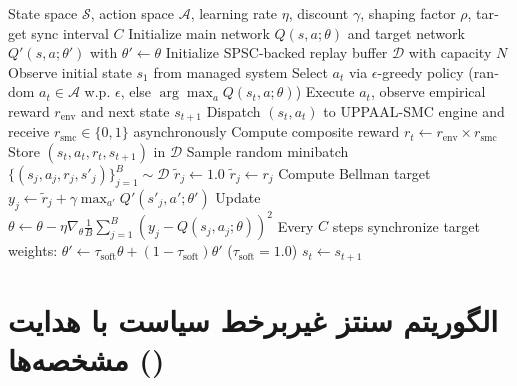 \documentclass[oneside,openany,phd]{TMU-Thesis}
\begin{document}
\begin{algorithm}[htbp]
\caption{الگوریتم آموزش چارچوب پایه‌ای  با شکل‌دهی تصادفی پاداش}
\label{alg:app_rs_drl_full}
\begin{latin}
\small
\begin{algorithmic}[1]
\REQUIRE State space $\mathcal{S}$, action space $\mathcal{A}$, learning rate $\eta$, discount $\gamma$, shaping factor $\rho$, target sync interval $C$
\STATE Initialize main network $Q(s, a; \theta)$ and target network $Q'(s, a; \theta')$ with $\theta' \leftarrow \theta$
\STATE Initialize SPSC-backed replay buffer $\mathcal{D}$ with capacity $N$
    \STATE Observe initial state $s_1$ from managed system
        \STATE Select $a_t$ via $\epsilon$-greedy policy (random $a_t \in \mathcal{A}$ w.p. $\epsilon$, else $\arg\max_a Q(s_t, a; \theta)$)
        \STATE Execute $a_t$, observe empirical reward $r_{\text{env}}$ and next state $s_{t+1}$
        \STATE Dispatch $(s_t, a_t)$ to UPPAAL-SMC engine and receive $r_{\text{smc}} \in \{0, 1\}$ asynchronously
        \STATE Compute composite reward $r_t \leftarrow r_{\text{env}} \times r_{\text{smc}}$
        \STATE Store $(s_t, a_t, r_t, s_{t+1})$ in $\mathcal{D}$ 
            \STATE Sample random minibatch $\{(s_j, a_j, r_j, s'_{j})\}_{j=1}^B \sim \mathcal{D}$
                    \STATE $\tilde{r}_j \leftarrow 1.0$ 
                \ELSE
                    \STATE $\tilde{r}_j \leftarrow r_j$ 
                \ENDIF
                \STATE Compute Bellman target $y_j \leftarrow \tilde{r}_j + \gamma \max_{a'} Q'(s'_j, a'; \theta')$
            \ENDFOR
            \STATE Update $\theta \leftarrow \theta - \eta \nabla_\theta \frac{1}{B} \sum_{j=1}^B (y_j - Q(s_j, a_j; \theta))^2$
        \ENDIF
        \STATE Every $C$ steps synchronize target weights: $\theta' \leftarrow \tau_{\text{soft}}\theta + (1-\tau_{\text{soft}})\theta'$ ($\tau_{\text{soft}}=1.0$)
        \STATE $s_t \leftarrow s_{t+1}$
    \ENDFOR
\ENDFOR
\end{algorithmic}
\end{latin}
\end{algorithm}

\section{الگوریتم سنتز غیربرخط سیاست با هدایت مشخصه‌ها (\texorpdfstring{\sgos}{SG-OS})}
\label{sec:app_algo_sgos}
\end{document}
